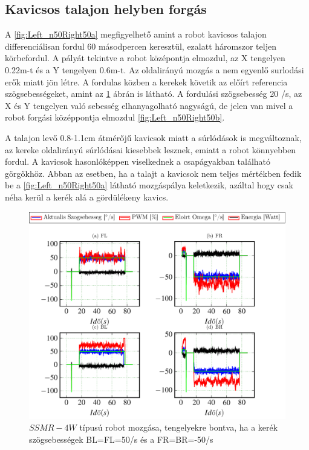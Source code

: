 \subsection{Kavicsos talajon helyben forgás}
A \ref{fig:Left_n50Right50a} megfigyelhető amint a robot kavicsos talajon differenciálisan fordul 60 másodpercen keresztül, ezalatt háromszor teljen körbefordul. A pályát tekintve a robot középontja elmozdul, az X tengelyen 0.22m-t és a Y tengelyen 0.6m-t.  Az oldalirányú mozgás a nem egyenlő surlodási erők miatt jön létre.
A fordulas közben a kerekek követik az előírt referencia szögsebességeket, amint az \ref{fig:Left_n50Right50x} ábrán is látható.
A fordulási szögsebesség 20 \degree/s, az X és Y tengelyen való sebesség elhanyagolható nagyságú, de jelen van mivel a robot forgási középpontja elmozdul \ref{fig:Left_n50Right50b}.

A talajon levő 0.8-1.1cm átmérőjű kavicsok miatt a súrlódások is megváltoznak, az kereke oldalirányú súrlódásai kiesebbek lesznek, emiatt a robot könnyebben fordul. A kavicsok hasonlóképpen viselkednek a csapágyakban található görgőkhöz.
Abban az esetben, ha a talajt a kavicsok nem teljes mértékben fedik be a \ref{fig:Left_n50Right50a} látható mozgáspálya keletkezik, azáltal hogy csak néha kerül a kerék alá a gördülékeny kavics.

\renewcommand{\nth}{2}
\renewcommand{\GlobalPath}{Meresek/Mozgasok/NormalMukodes/DiferencialisanHelybeKavicsos/}
\renewcommand{\secondImage}{*}



\begin{figure}[H]
  \includegraphics{tikz/Left_n50Right50x.pdf}
  \caption{$SSMR-4W$ típusú robot mozgása, tengelyekre bontva, ha a kerék szögsebességek BL=FL=50\degree/s és a FR=BR=-50\degree/s}
  \label{fig:Left_n50Right50x}
\end{figure}


